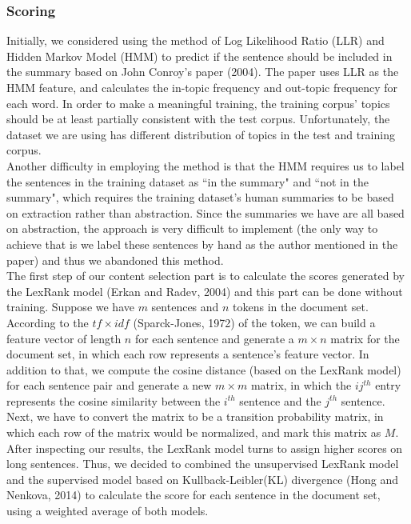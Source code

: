\documentclass[11pt]{article}
\begin{document}
\subsubsection{Scoring}
Initially, we considered using the method of Log Likelihood Ratio (LLR) and Hidden Markov Model (HMM) to predict if the sentence should be included in the summary based on John Conroy's paper (2004). The paper uses LLR as the HMM feature, and calculates the in-topic frequency and out-topic frequency for each word. In order to make a meaningful training, the training corpus' topics should be at least partially consistent with the test corpus. Unfortunately, the dataset we are using has different distribution of topics in the test and training corpus. \\
\indent
Another difficulty in employing the method is that the HMM requires us to label the sentences in the training dataset as ``in the summary" and ``not in the summary", which requires the training dataset's human summaries to be based on extraction rather than abstraction. Since the summaries we have are all based on abstraction, the approach is very difficult to implement (the only way to achieve that is we label these sentences by hand as the author mentioned in the paper) and thus we abandoned this method. \\
\indent
The first step of our content selection part is to calculate the scores generated by the LexRank model (Erkan and Radev, 2004) and this part can be done without training. Suppose we have $m$ sentences and $n$ tokens in the document set. According to the $tf\times idf$ (Sparck-Jones, 1972) of the token, we can build a feature vector of length $n$ for each sentence and generate a $m\times n$ matrix for the document set, in which each row represents a sentence's feature vector. In addition to that, we compute the cosine distance (based on the LexRank model) for each sentence pair and generate a new $m\times m$ matrix, in which the $ij^{th}$ entry represents the cosine similarity between the $i^{th}$ sentence and the $j^{th}$ sentence. Next, we have to convert the matrix to be a transition probability matrix, in which each row of the matrix would be normalized, and mark this matrix as $M$. \\
\indent
After inspecting our results, the LexRank model turns to assign higher scores on long sentences. Thus, we decided to combined the unsupervised LexRank model and the supervised model based on Kullback-Leibler(KL) divergence (Hong and Nenkova, 2014) to calculate the score for each sentence in the document set, using a weighted average of both models. \\
\end{document}
